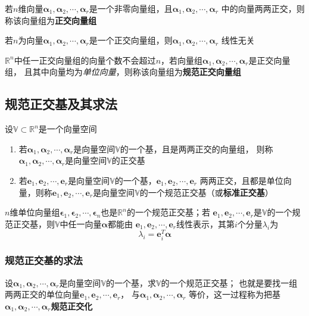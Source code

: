 \documentclass[UTF8]{ctexart}
\newcommand{\ve}[1]{{\bm{#1}}}
\newcommand{\mat}[1]{\ve{#1}}
\newcommand{\set}[1]{{\mathbb{#1}}}
\newcommand{\emplin}{\vspace{1em}}
\begin{document}
\emplin
\emplin
\emplin

若$n$维向量$\mat{\alpha}_1,\mat{\alpha}_2,\cdots,\mat{\alpha}_r$是一个非零向量组，且$\mat{\alpha}_1,\mat{\alpha}_2,\cdots,\mat{\alpha}_r$
中的向量两两正交，则称该向量组为\textbf{正交向量组}

若$n$为向量$\mat{\alpha}_1,\mat{\alpha}_2,\cdots,\mat{\alpha}_r$是一个正交向量组，则$\mat{\alpha}_1,\mat{\alpha}_2,\cdots,\mat{\alpha}_r$
线性无关

\emplin
\emplin

$\set{R}^n$中任一正交向量组的向量个数不会超过$n$，若向量组$\mat{\alpha}_1,\mat{\alpha}_2,\cdots,\mat{\alpha}_r$是正交向量组，
且其中向量均为\emph{单位向量}，则称该向量组为\textbf{规范正交向量组}

\subsection*{规范正交基及其求法}
设$\set{V}\subset\set{R}^n$是一个向量空间
\begin{enumerate}
  \item 若$\mat{\alpha}_1,\mat{\alpha}_2,\cdots,\mat{\alpha}_r$是向量空间$\set{V}$的一个基，且是两两正交的向量组，
  则称$\mat{\alpha}_1,\mat{\alpha}_2,\cdots,\mat{\alpha}_r$是向量空间$\set{V}$的正交基
  \item 若$\mat{e}_1,\mat{e}_2,\cdots,\mat{e}_r$是向量空间$\set{V}$的一个基，$\mat{e}_1,\mat{e}_2,\cdots,\mat{e}_r$
  两两正交，且都是单位向量，则称$\mat{e}_1,\mat{e}_2,\cdots,\mat{e}_r$是向量空间$\set{V}$的一个规范正交基（或\textbf{标准正交基}）
\end{enumerate}

\emplin

$n$维单位向量组$\mat{\epsilon}_1,\mat{\epsilon}_2,\cdots,\mat{\epsilon}_n$也是$\set{R}^n$的一个规范正交基；若
$\mat{e}_1,\mat{e}_2,\cdots,\mat{e}_r$是$\set{V}$的一个规范正交基，则$\set{V}$中任一向量$\mat{\alpha}$都能由
$\mat{e}_1,\mat{e}_2,\cdots,\mat{e}_r$线性表示，其第$i$个分量$\lambda_i$为
\[\lambda_i=\mat{e}_i^T\mat{\alpha}\]

\subsubsection*{规范正交基的求法}
设$\mat{\alpha}_1,\mat{\alpha}_2,\cdots,\mat{\alpha}_r$是向量空间$\set{V}$的一个基，求$\set{V}$的一个规范正交基；
也就是要找一组两两正交的单位向量$\mat{e}_1,$$\mat{e}_2,\cdots,$$\mat{e}_r$，
与$\mat{\alpha}_1,\mat{\alpha}_2,\cdots,\mat{\alpha}_r$
等价，这一过程称为把基$\mat{\alpha}_1,\mat{\alpha}_2,\cdots,\mat{\alpha}_r$\textbf{规范正交化}
\end{document}
